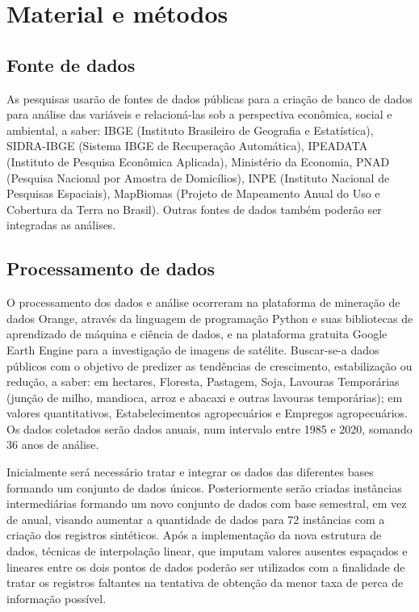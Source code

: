 \thispagestyle{empty}

\section{Material e métodos}

\subsection{Fonte de dados}
As pesquisas usarão de fontes de dados públicas para a criação de banco de dados para análise das variáveis e relacioná-las sob a perspectiva
econômica, social e ambiental, a saber: IBGE (Instituto Brasileiro de Geografia e Estatística), SIDRA-IBGE (Sistema IBGE de Recuperação Automática),
IPEADATA (Instituto de Pesquisa Econômica Aplicada), Ministério da Economia, PNAD (Pesquisa Nacional por Amostra de Domicílios), INPE (Instituto
Nacional de Pesquisas Espaciais), MapBiomas (Projeto de Mapeamento Anual do Uso e Cobertura da Terra no Brasil). Outras fontes de dados também
poderão ser integradas as análises.

\subsection{Processamento de dados}

O processamento dos dados e análise ocorreram na plataforma de mineração de dados Orange, através da linguagem de programação Python e suas
bibliotecas de aprendizado de máquina e ciência de dados, e na plataforma gratuita Google Earth Engine para a investigação de imagens de satélite.
Buscar-se-a dados públicos com o objetivo de predizer as tendências de crescimento, estabilização ou redução, a saber: em hectares, Floresta,
Pastagem, Soja, Lavouras Temporárias (junção de milho, mandioca, arroz e abacaxi e outras lavouras temporárias); em valores quantitativos,
Estabelecimentos agropecuários e Empregos agropecuários. Os dados coletados serão dados anuais, num intervalo entre 1985 e 2020, somando 36 anos
de análise.

Inicialmente será necessário tratar e integrar os dados das diferentes bases formando um conjunto de dados únicos. Posteriormente serão criadas
instâncias intermediárias formando um novo conjunto de dados com base semestral, em vez de anual, visando aumentar a quantidade de dados para 72 instâncias com a criação dos registros sintéticos. Após a implementação da nova estrutura de dados, técnicas de interpolação linear, que imputam valores ausentes espaçados e lineares entre os dois pontos de dados poderão ser utilizados com a finalidade de tratar os registros faltantes na tentativa de obtenção da menor taxa de perca de informação possível.

